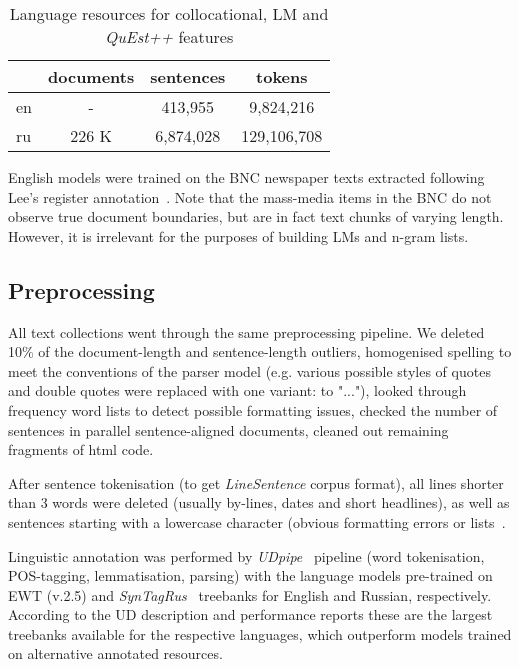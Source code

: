 \begin{table}[H]
	\centering
	\begin{tabular}{l|ccc}
	\toprule
		 & documents & sentences & tokens      \\
	\midrule
	en   & -         & 413,955   & 9,824,216   \\
	ru   & 226 K     & 6,874,028 & 129,106,708 \\ 
	\bottomrule
\end{tabular}
 \caption{\label{tab:lmres} Language resources for collocational, LM and \textit{QuEst++} features}
\end{table}

English models were trained on the \gls{BNC} newspaper texts extracted following Lee's register annotation~\cite{Lee01}. Note that the mass-media items in the BNC do not observe true document boundaries, but are in fact text chunks of varying length. However, it is irrelevant for the purposes of building LMs and n-gram lists.

\subsection{\label{ssec:prepro}Preprocessing}
All text collections went through the same preprocessing pipeline.
We deleted 10\% of the document-length and sentence-length outliers, homogenised spelling to meet the conventions of the parser model (e.g. various possible styles of quotes and double quotes were replaced with one variant:  to "..."), looked through frequency word lists to detect possible formatting issues, checked the number of sentences in parallel sentence-aligned documents, cleaned out remaining fragments of html code.

After sentence tokenisation (to get \textit{LineSentence} corpus format), all lines shorter than 3 words were deleted (usually by-lines, dates and short headlines), as well as sentences starting with a lowercase character (obvious formatting errors or lists~\cite[see similar filtering rule in][]{Guzman2019}. 

Linguistic annotation was performed by \textit{UDpipe}~\cite[][v.1.2.0]{Straka2017}  pipeline (word tokenisation, POS-tagging, lemmatisation, parsing) with the language models pre-trained on \gls{EWT} (v.2.5) and \textit{SynTagRus}~\cite[v2.5,][]{Droganova2018} treebanks for English and Russian, respectively. According to the UD description and performance reports these are the largest treebanks available for the respective languages, which outperform models trained on alternative annotated resources.

